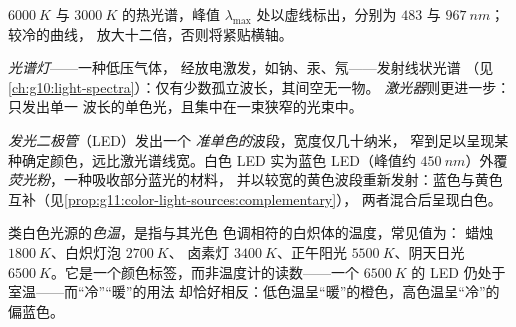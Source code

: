 \begin{omfigure}

{\small $\qty{6000}{K}$ 与 $\qty{3000}{K}$ 的热光谱，峰值
$\lambda_{\max}$ 处以虚线标出，分别为 $483$ 与 $\qty{967}{nm}$；较冷的曲线，
放大十二倍，否则将紧贴横轴。}
\end{omfigure}

\begin{definition}[光谱灯与激光器]\label{def:g11:color-light-sources:lamps}
\emph{光谱灯}——一种低压气体，
经放电激发，如钠、汞、氖——发射线状光谱
（见\cref{ch:g10:light-spectra}）：仅有少数孤立波长，其间空无一物。
\emph{激光器}则更进一步：只发出单一
波长的单色光，且集中在一束狭窄的光束中。
\end{definition}

\begin{definition}[发光二极管]\label{def:g11:color-light-sources:led}
\emph{发光二极管}（LED）发出一个
\emph{准单色的}波段，宽度仅几十纳米，
窄到足以呈现某种确定颜色，远比激光谱线宽。白色
LED 实为蓝色 LED（峰值约 $\qty{450}{nm}$）外覆
\emph{荧光粉}，一种吸收部分蓝光的材料，
并以较宽的黄色波段重新发射：蓝色与黄色
互补（见\cref{prop:g11:color-light-sources:complementary}），
两者混合后呈现白色。
\end{definition}

\begin{definition}[色温]\label{def:g11:color-light-sources:colortemp}
类白色光源的\emph{色温}，是指与其光色
色调相符的白炽体的温度，常见值为：
蜡烛 $\qty{1800}{K}$、白炽灯泡 $\qty{2700}{K}$、
卤素灯 $\qty{3400}{K}$、正午阳光 $\qty{5500}{K}$、阴天日光
$\qty{6500}{K}$。它是一个颜色标签，而非温度计的读数——一个
$\qty{6500}{K}$ 的 LED 仍处于室温——而“冷”“暖”的用法
却恰好相反：低色温呈“暖”的橙色，高色温呈“冷”的
偏蓝色。
\end{definition}

